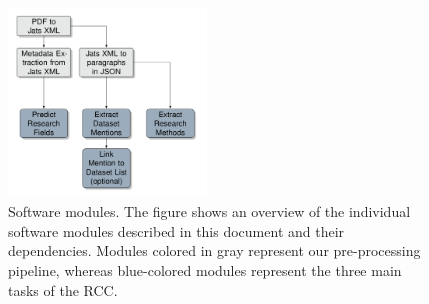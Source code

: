 



\begin{figure}[t]
    \includegraphics[width=0.47\textwidth]{figures/information-flow.png}
    \caption{Software modules. The figure shows an overview of the individual software modules described in this document and their dependencies. Modules colored in gray represent our pre-processing pipeline, whereas blue-colored modules represent the three main tasks of the RCC.}
    \label{figure:pipeline}
\end{figure}

